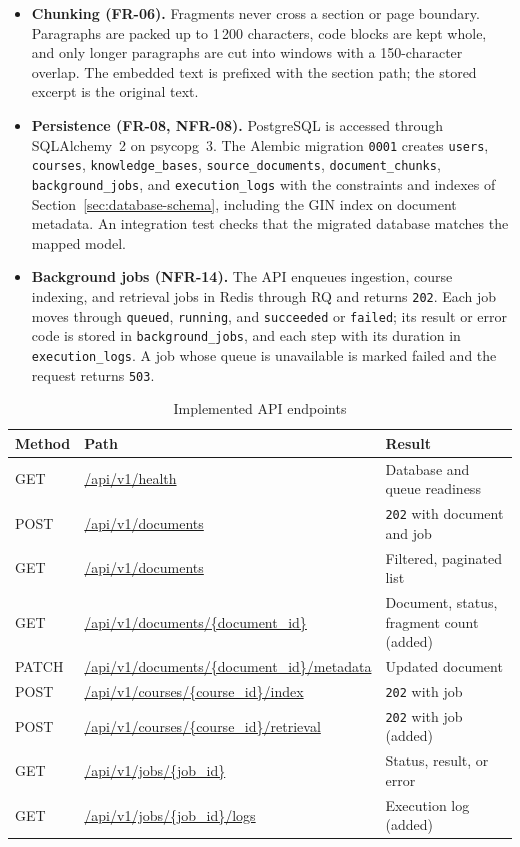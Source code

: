 \documentclass[12pt,a4paper]{article}
\begin{document}
\begin{itemize}
    \item \textbf{Chunking (FR-06).} Fragments never cross a section or
    page boundary. Paragraphs are packed up to 1\,200 characters, code
    blocks are kept whole, and only longer paragraphs are cut into
    windows with a 150-character overlap. The embedded text is
    prefixed with the section path; the stored excerpt is the original
    text.

    \item \textbf{Persistence (FR-08, NFR-08).} PostgreSQL is accessed
    through SQLAlchemy~2 on psycopg~3. The Alembic migration
    \texttt{0001} creates \texttt{users}, \texttt{courses},
    \texttt{knowledge\_bases}, \texttt{source\_documents},
    \texttt{document\_chunks}, \texttt{background\_jobs}, and
    \texttt{execution\_logs} with the constraints and indexes of
    Section~\ref{sec:database-schema}, including the GIN index on
    document metadata. An integration test checks that the migrated
    database matches the mapped model.

    \item \textbf{Background jobs (NFR-14).} The API enqueues ingestion,
    course indexing, and retrieval jobs in Redis through RQ and returns
    \texttt{202}. Each job moves through \texttt{queued},
    \texttt{running}, and \texttt{succeeded} or \texttt{failed}; its
    result or error code is stored in \texttt{background\_jobs}, and
    each step with its duration in \texttt{execution\_logs}. A job
    whose queue is unavailable is marked failed and the request returns
    \texttt{503}.
\end{itemize}

\begin{table}[htbp]
\centering
\small
\renewcommand{\arraystretch}{1.25}
\begin{tabularx}{\textwidth}{|p{13mm}|p{62mm}|X|}
\hline
\textbf{Method} & \textbf{Path} & \textbf{Result} \\
\hline
GET & \url{/api/v1/health} & Database and queue readiness \\
\hline
POST & \url{/api/v1/documents} & \texttt{202} with document and job \\
\hline
GET & \url{/api/v1/documents} & Filtered, paginated list \\
\hline
GET & \url{/api/v1/documents/{document_id}} & Document, status, fragment count (added) \\
\hline
PATCH & \url{/api/v1/documents/{document_id}/metadata} & Updated document \\
\hline
POST & \url{/api/v1/courses/{course_id}/index} & \texttt{202} with job \\
\hline
POST & \url{/api/v1/courses/{course_id}/retrieval} & \texttt{202} with job (added) \\
\hline
GET & \url{/api/v1/jobs/{job_id}} & Status, result, or error \\
\hline
GET & \url{/api/v1/jobs/{job_id}/logs} & Execution log (added) \\
\hline
\end{tabularx}
\caption{Implemented API endpoints}
\label{tab:stage3-endpoints}
\end{table}
\end{document}
